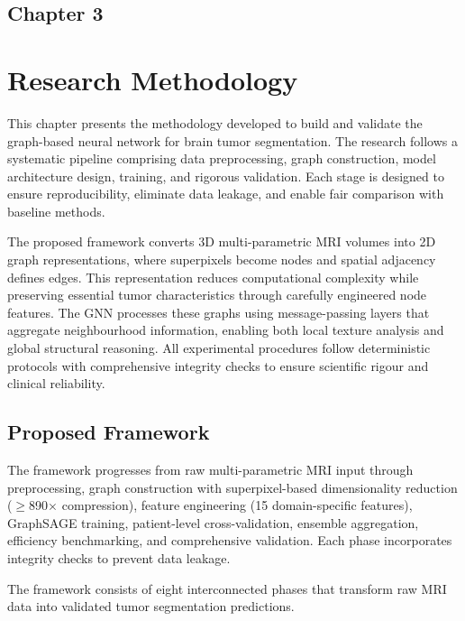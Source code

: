 \begin{center}
    \section*{\fontsize{20}{20}\selectfont Chapter 3}
\end{center}
\vspace{10mm}
\section{Research Methodology}

This chapter presents the methodology developed to build and validate the graph-based neural network for brain tumor segmentation. The research follows a systematic pipeline comprising data preprocessing, graph construction, model architecture design, training, and rigorous validation. Each stage is designed to ensure reproducibility, eliminate data leakage, and enable fair comparison with baseline methods.

The proposed framework converts 3D multi-parametric MRI volumes into 2D graph representations, where superpixels become nodes and spatial adjacency defines edges. This representation reduces computational complexity while preserving essential tumor characteristics through carefully engineered node features. The GNN processes these graphs using message-passing layers that aggregate neighbourhood information, enabling both local texture analysis and global structural reasoning. All experimental procedures follow deterministic protocols with comprehensive integrity checks to ensure scientific rigour and clinical reliability.


\subsection{Proposed Framework}

The framework progresses from raw multi-parametric MRI input through preprocessing, graph construction with superpixel-based dimensionality reduction ($\geq$890$\times$ compression), feature engineering (15 domain-specific features), GraphSAGE training, patient-level cross-validation, ensemble aggregation, efficiency benchmarking, and comprehensive validation. Each phase incorporates integrity checks to prevent data leakage.

The framework consists of eight interconnected phases that transform raw MRI data into validated tumor segmentation predictions.

